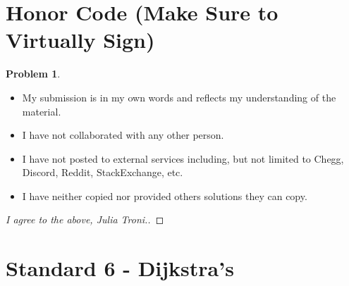 \documentclass[11pt]{article}
\theoremstyle{definition}
\theoremstyle{definition}
\newtheorem{required}{Problem}
\theoremstyle{definition}
\begin{document}
\section{Honor Code (Make Sure to Virtually Sign)} \label{HonorCode}

\begin{required}
\noindent 
\begin{itemize}
\item My submission is in my own words and reflects my understanding of the material.
\item I have not collaborated with any other person.
\item I have not posted to external services including, but not limited to Chegg, Discord, Reddit, StackExchange, etc.
\item I have neither copied nor provided others solutions they can copy.
\end{itemize}

\end{required}

\begin{proof}[I agree to the above, Julia Troni.]
\end{proof}



\newpage
\section{Standard 6 - Dijkstra's}
\end{document}
